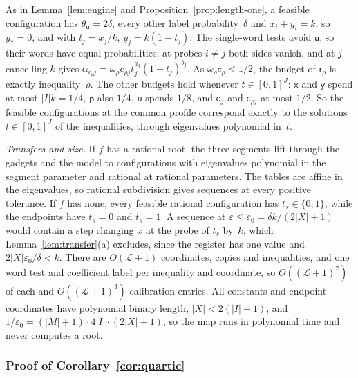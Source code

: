 As in Lemma~\ref{lem:engine} and Proposition~\ref{prop:length-one}, a
feasible configuration has $\theta_{\mathsf u}=2\delta$, every other label
probability~$\delta$ and $x_i+y_i=k$; so $y_\ast=0$, and with $t_j=x_j/k$,
$y_j=k(1-t_j)$. The single-word tests avoid $\mathsf u$, so their words
have equal probabilities; at probes $i\neq j$ both sides vanish, and at
$j$ cancelling $k$ gives
$\alpha_{\mathsf r_\rho j}=\omega_\rho c_{\rho j}t_j^{a_j}(1-t_j)^{b_j}$. As
$\omega_\rho c_\rho<1/2$, the budget of $\mathsf r_\rho$ is exactly
inequality~$\rho$. The other budgets hold whenever $t\in[0,1]^J$:
$\mathsf x$ and $\mathsf y$ spend at most $|I|k=1/4$, $\mathsf p$ also
$1/4$, $\mathsf u$ spends $1/8$, and $\mathsf o_j$ and $\mathsf c_{\rho j}$
at most $1/2$. So the feasible configurations at the common profile
correspond exactly to the solutions $t\in[0,1]^J$ of the inequalities,
through eigenvalues polynomial in~$t$.

\emph{Transfers and size.} If $f$ has a rational root, the three segments
lift through the gadgets and the model to configurations with eigenvalues
polynomial in the segment parameter and rational at rational parameters.
The tables are affine in the eigenvalues, so rational subdivision gives
sequences at every positive tolerance. If
$f$ has none, every feasible rational configuration has $t_s\in\{0,1\}$,
while the endpoints have $t_s=0$ and $t_s=1$. A sequence at
$\varepsilon\le\varepsilon_0=\delta k/(2|X|+1)$ would contain a step
changing $x$ at the probe of $t_s$ by~$k$, which Lemma~\ref{lem:transfer}(a) excludes, since the register has one value and $2|X|\varepsilon_0/\delta<k$. There are $O(\mathcal L+1)$ coordinates,
copies and inequalities, and one word test and coefficient label per
inequality and coordinate, so $O((\mathcal L+1)^2)$ of each and $O((\mathcal L+1)^3)$
calibration entries. All constants and endpoint coordinates have
polynomial binary length, $|X|<2(|I|+1)$, and
$1/\varepsilon_0=(|M|+1)\cdot4|I|\cdot(2|X|+1)$, so the map runs in
polynomial time and never computes a root.

\subsubsection{Proof of Corollary~\ref{cor:quartic}}\label{app:quartic}

